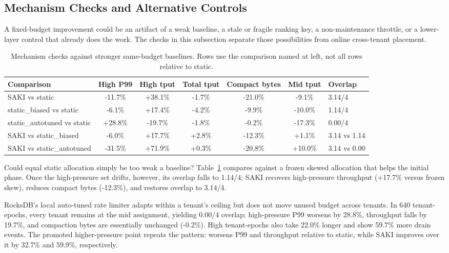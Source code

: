 \subsection{Mechanism Checks and Alternative Controls}
\label{sec:cgroup-baseline}

A fixed-budget improvement could be an artifact of a weak baseline, a stale
or fragile ranking key, a non-maintenance throttle, or a lower-layer control
that already does the work. The checks in this subsection separate those
possibilities from online cross-tenant placement.

\begin{table}[!t]
  \centering
  \caption{Mechanism checks against stronger same-budget baselines.  Rows use
  the comparison named at left, not all rows relative to static.}
  \label{tab:evaluation-stronger-baselines}
  \small
  \setlength{\tabcolsep}{4.4pt}
  \begin{tabular}{lcccccl}
    \toprule
    Comparison & High P99 & High tput & Total tput & Compact bytes & Mid tput & Overlap \\
    \midrule
    SAKI vs static & -11.7\% & +38.1\% & -1.7\% & -21.0\% & -9.1\% & 3.14/4 \\
    static\_biased vs static & -6.1\% & +17.4\% & -4.2\% & -9.9\% & -10.0\% & 1.14/4 \\
    static\_autotuned vs static & +28.8\% & -19.7\% & -1.8\% & -0.2\% & -17.3\% & 0.00/4 \\
    SAKI vs static\_biased & -6.0\% & +17.7\% & +2.8\% & -12.3\% & +1.1\% & 3.14 vs 1.14 \\
    SAKI vs static\_autotuned & -31.5\% & +71.9\% & +0.3\% & -20.8\% & +10.0\% & 3.14 vs 0.00 \\
    \bottomrule
  \end{tabular}
\end{table}

Could equal static allocation simply be too weak a baseline?
Table~\ref{tab:evaluation-stronger-baselines} compares against a frozen skewed
allocation that helps the initial phase. Once the high-pressure set drifts,
however, its overlap falls to 1.14/4; SAKI recovers high-pressure throughput
(+17.7\% versus frozen skew), reduces compact bytes (-12.3\%), and restores
overlap to 3.14/4.

RocksDB's local auto-tuned rate limiter adapts within a tenant's ceiling but
does not move unused budget across tenants. In 640 \staticautotuned
tenant-epochs, every tenant remains at the mid assignment, yielding 0.00/4
overlap; high-pressure P99 worsens by 28.8\%, throughput falls by 19.7\%, and
compaction bytes are essentially unchanged (-0.2\%). High tenant-epochs also
take 22.0\% longer and show 59.7\% more drain events. The promoted
higher-pressure point repeats the pattern: \staticautotuned worsens P99 and
throughput relative to static, while SAKI improves over it by 32.7\% and
59.9\%, respectively.

